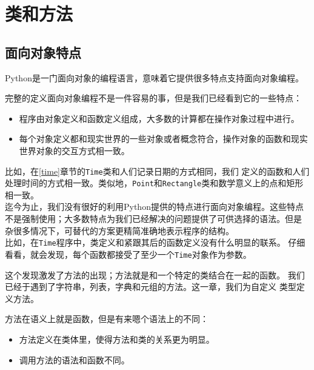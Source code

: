 \chapter{类和方法}

\section{面向对象特点}


Python是一门面向对象的编程语言，意味着它提供很多特点支持面向对象编程。

完整的定义面向对象编程不是一件容易的事，但是我们已经看到它的一些特点：

\begin{itemize}

\item 程序由对象定义和函数定义组成，大多数的计算都在操作对象过程中进行。

\item 每个对象定义都和现实世界的一些对象或者概念符合，操作对象的函数和现实世界对象的交互方式相一致。

\end{itemize}

比如，在\ref{time}章节的{\tt Time}类和人们记录日期的方式相同，我们
定义的函数和人们处理时间的方式相一致。类似地，{\tt Point}和{\tt Rectangle}类和数学意义上的点和矩形相一致。\\

迄今为止，我们没有很好的利用Python提供的特点进行面向对象编程。这些特点不是强制使用；大多数特点为我们已经解决的问题提供了可供选择的语法。但是
杂很多情况下，可替代的方案更精简准确地表示程序的结构。\\

比如，在{\tt Time}程序中，类定义和紧跟其后的函数定义没有什么明显的联系。
仔细看看，就会发现，每个函数都接受了至少一个{\tt Time}对象作为参数。


这个发现激发了方法的出现；方法就是和一个特定的类结合在一起的函数。
我们已经于遇到了字符串，列表，字典和元组的方法。这一章，我们为自定义
类型定义方法。


方法在语义上就是函数，但是有来嗯个语法上的不同：

\begin{itemize}

\item 方法定义在类体里，使得方法和类的关系更为明显。

\item 调用方法的语法和函数不同。
\end{itemize}

